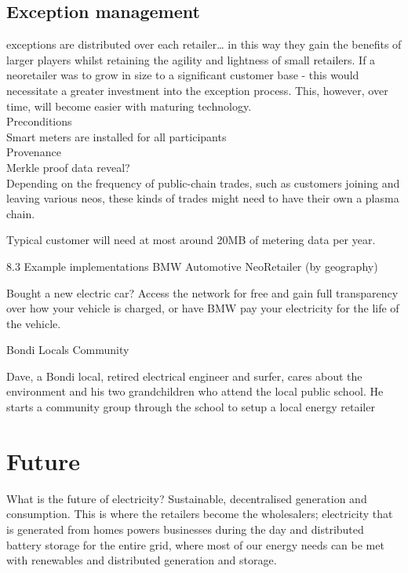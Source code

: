 \documentclass{article}
\theoremstyle{definition}
\theoremstyle{plain} %
\begin{document}
\subsection{Exception management}

exceptions are distributed over each retailer… in this way they gain the benefits of larger players whilst retaining the agility and lightness of small retailers. If a neoretailer was to grow in size to a significant customer base - this would necessitate a greater investment into the exception process. This, however, over time, will become easier with maturing technology.\\

Preconditions\\

Smart meters are installed for all participants\\

Provenance\\

Merkle proof data reveal?\\


Depending on the frequency of public-chain trades, such as customers joining and leaving various neos, these kinds of trades might need to have their own a plasma chain.


Typical customer will need at most around 20MB of metering data per year.

8.3 Example implementations
BMW Automotive NeoRetailer (by geography)

Bought a new electric car? Access the network for free and gain full transparency over how your vehicle is charged, or have BMW pay your electricity for the life of the vehicle.


Bondi Locals Community

Dave, a Bondi local, retired electrical engineer and surfer, cares about the environment and his two grandchildren who attend the local public school. He starts a community group through the school to setup a local energy retailer 





\pagebreak
\section{Future}

What is the future of electricity? Sustainable, decentralised generation and consumption. This is where the retailers become the wholesalers; electricity that is generated from homes powers businesses during the day and distributed battery storage for the entire grid, where most of our energy needs can be met with renewables and distributed generation and storage. \\
\end{document}
